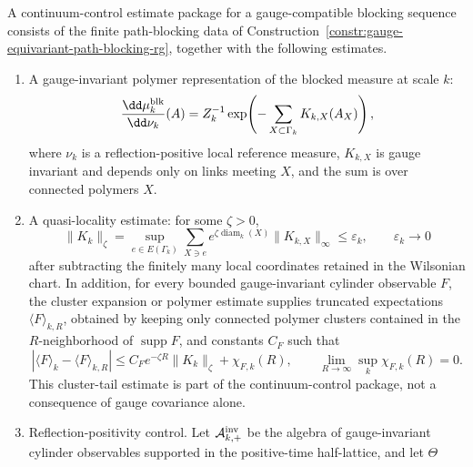 \begin{definition}
\label{def:gauge-blocking-continuum-control-datum}
A continuum-control estimate package for a gauge-compatible blocking sequence consists
of the finite path-blocking data of
Construction~\ref{constr:gauge-equivariant-path-blocking-rg}, together with
the following estimates.
\begin{enumerate}
  \item A gauge-invariant polymer representation of the blocked measure at
  scale \(k\):
  \begin{equation}
    \frac{\dd\mu_k^{\rm blk}}{\dd\nu_k}(A)
    =
    Z_k^{-1}
    \exp\!\left(-\sum_{X\subset\Gamma_k}K_{k,X}(A_X)\right),
    \label{eq:gauge-blocked-polymer-representation}
  \end{equation}
  where \(\nu_k\) is a reflection-positive local reference measure,
  \(K_{k,X}\) is gauge invariant and depends only on links meeting \(X\),
  and the sum is over connected polymers \(X\).
  \item A quasi-locality estimate: for some \(\zeta>0\),
  \begin{equation}
    \|K_k\|_{\zeta}
    =
    \sup_{e\in E(\Gamma_k)}
    \sum_{X\ni e}
      e^{\zeta\operatorname{diam}_k(X)}
      \|K_{k,X}\|_\infty
    \leq \varepsilon_k ,
    \qquad
    \varepsilon_k\longrightarrow0
    \label{eq:gauge-blocking-polymer-locality-norm}
  \end{equation}
  after subtracting the finitely many local coordinates retained in the
  Wilsonian chart.  In addition, for every bounded gauge-invariant cylinder
  observable \(F\), the cluster expansion or polymer estimate supplies
  truncated expectations \(\langle F\rangle_{k,R}\), obtained by keeping only
  connected polymer clusters contained in the \(R\)-neighborhood of
  \(\operatorname{supp}F\), and constants \(C_F\) such that
  \begin{equation}
    \left|
      \langle F\rangle_k-\langle F\rangle_{k,R}
    \right|
    \leq
    C_F e^{-\zeta R}\|K_k\|_{\zeta}
    +\chi_{F,k}(R),
    \qquad
    \lim_{R\to\infty}\sup_k\chi_{F,k}(R)=0 .
    \label{eq:gauge-blocking-cluster-tail-estimate}
  \end{equation}
  This cluster-tail estimate is part of the continuum-control package, not a
  consequence of gauge covariance alone.
  \item Reflection-positivity control.  Let
  \(\mathcal A_{k,+}^{\rm inv}\) be the algebra of gauge-invariant cylinder
  observables supported in the positive-time half-lattice, and let \(\Theta\)

\end{enumerate}
\end{definition}

